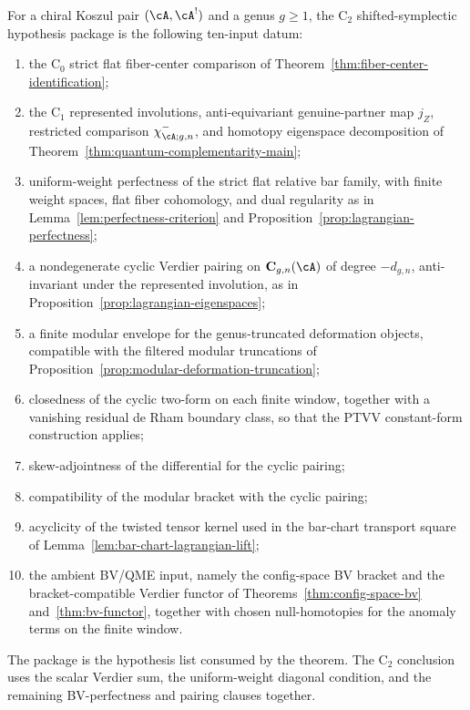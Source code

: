 \begin{definition}
\label{def:C2-shifted-symplectic-hypothesis-package}
For a chiral Koszul pair $(\cA,\cA^!)$ and a genus $g\geq1$, the
$\mathrm{C}_2$ shifted-symplectic hypothesis package is the following
ten-input datum:
\begin{enumerate}[label=\textup{(C2.\arabic*)}]
\item the $\mathrm{C}_0$ strict flat fiber-center comparison of
Theorem~\ref{thm:fiber-center-identification};
\item the $\mathrm{C}_1$ represented involutions, anti-equivariant
genuine-partner map \(j_Z\), restricted comparison \(\chi^-_{\cA;g,n}\),
and homotopy eigenspace decomposition of
Theorem~\ref{thm:quantum-complementarity-main};
\item uniform-weight perfectness of the strict flat relative bar family,
with finite weight spaces, flat fiber cohomology, and dual regularity
as in Lemma~\ref{lem:perfectness-criterion} and
Proposition~\ref{prop:lagrangian-perfectness};
\item a nondegenerate cyclic Verdier pairing on
$\mathbf{C}_{g,n}(\cA)$ of degree \(-d_{g,n}\), anti-invariant under
the represented involution,
as in Proposition~\ref{prop:lagrangian-eigenspaces};
\item a finite modular envelope for the genus-truncated deformation
objects, compatible with the filtered modular truncations of
Proposition~\ref{prop:modular-deformation-truncation};
\item closedness of the cyclic two-form on each finite window, together
with a vanishing residual de Rham boundary class, so that the PTVV
constant-form construction applies;
\item skew-adjointness of the differential for the cyclic pairing;
\item compatibility of the modular bracket with the cyclic pairing;
\item acyclicity of the twisted tensor kernel used in the bar-chart
transport square of Lemma~\ref{lem:bar-chart-lagrangian-lift};
\item the ambient BV/QME input, namely the config-space BV bracket and
the bracket-compatible Verdier functor of
Theorems~\ref{thm:config-space-bv} and~\ref{thm:bv-functor}, together
with chosen null-homotopies for the anomaly terms on the finite window.
\end{enumerate}
The package is the hypothesis list consumed by the theorem.  The
$\mathrm{C}_2$ conclusion uses the scalar Verdier sum, the
uniform-weight diagonal condition, and the remaining BV-perfectness
and pairing clauses together.
\end{definition}

